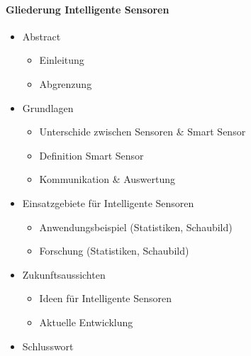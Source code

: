 \documentclass[a4paper,12pt]{scrartcl}
\begin{document}
\paragraph{Gliederung Intelligente Sensoren}

\begin{itemize}
\item Abstract
	\begin{itemize}
	\item Einleitung
	\item Abgrenzung
	\end{itemize}
\item Grundlagen
\begin{itemize}
	\item Unterschide zwischen Sensoren \& Smart Sensor
	\item Definition Smart Sensor
	\item Kommunikation \& Auswertung
	\end{itemize}
\item Einsatzgebiete für Intelligente Sensoren
\begin{itemize}
	\item Anwendungsbeispiel (Statistiken, Schaubild)
	\item Forschung (Statistiken, Schaubild)
	\end{itemize}
\item Zukunftsaussichten
\begin{itemize}
	\item Ideen für Intelligente Sensoren
	\item Aktuelle Entwicklung
	\end{itemize}
\item Schlusswort
\end{itemize}
\end{document}
